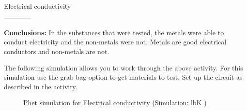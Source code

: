 \begin{i_experiment}{Electrical conductivity}
{\begin{table}[H]
\begin{center}
\begin{xtabular}[t]{|l|l|l|l|}
         &
         &
         &
     \tabularnewline{}
    \end{xtabular}
      \end{center}
\end{table}
    \par
  \par 
      \label{m38706*id66494}\noindent{}\textbf{Conclusions:}
        \newline
  In the substances that were tested, the metals were able to conduct electricity and the non-metals were not. Metals are good electrical conductors and non-metals are not.\par }
            \end{i_experiment}
\label{m38706*eip-316}The following simulation allows you to work through the above activity. For this simulation use the grab bag option to get materials to test. Set up the circuit as described in the activity.
    \setcounter{subfigure}{0}
	\begin{figure}[H] %
    \textnormal{Phet simulation for Electrical conductivity}\vspace{.1in} \nopagebreak
  \label{m38806*phet!!!underscore!!!sim}\label{m38806*phet-simulation}
             { (Simulation:  lbK )}
      \vspace{2pt}
    \vspace{.1in}
 \end{figure}    
        \par 
    \label{m38706*cid7}
